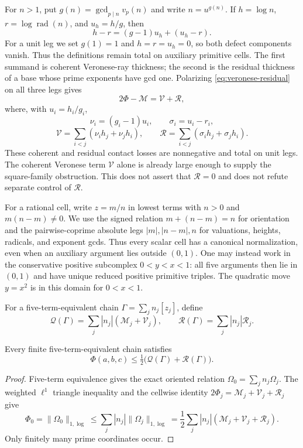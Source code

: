 For $n>1$, put $g(n)=\gcd_{p\mid n}v_p(n)$ and write $n=u^{g(n)}$.
If $h=\log n$, $r=\log\operatorname{rad}(n)$, and $u_h=h/g$, then
\begin{equation}
 h-r=(g-1)u_h+(u_h-r).
 \label{eq:veronese-residual}
\end{equation}
For a unit leg we set $g(1)=1$ and $h=r=u_h=0$, so both defect
components vanish.  Thus the definitions remain total on auxiliary
primitive cells.
The first summand is coherent Veronese-ray thickness; the second is the
residual thickness of a base whose prime exponents have gcd one.  Polarizing
\eqref{eq:veronese-residual} on all three legs gives
\[
 2\Phi-\mathcal M=\mathcal V+\mathcal R,
\]
where, with $u_i=h_i/g_i$,
\[
 \nu_i=(g_i-1)u_i,\qquad \sigma_i=u_i-r_i,
\]
\[
 \mathcal V=\sum_{i<j}(\nu_i h_j+\nu_j h_i),\qquad
 \mathcal R=\sum_{i<j}(\sigma_i h_j+\sigma_j h_i).
\]
These coherent and residual contact losses are nonnegative and total on
unit legs.  The coherent Veronese term $\mathcal V$ alone is already large
enough to supply the square-family obstruction.  This does not assert that
$\mathcal R=0$ and does not refute separate control of $\mathcal R$.

For a rational cell, write $z=m/n$ in lowest terms with $n>0$ and
$m(n-m)\ne0$.  We use the signed relation $m+(n-m)=n$ for orientation and
the pairwise-coprime absolute legs $|m|,|n-m|,n$ for valuations, heights,
radicals, and exponent gcds.  Thus every scalar cell has a canonical
normalization, even when an auxiliary argument lies outside $(0,1)$.
One may instead work in the conservative positive subcomplex
$0<y<x<1$: all five arguments then lie in $(0,1)$ and have unique reduced
positive primitive triples.  The quadratic move $y=x^2$ is in this domain
for $0<x<1$.

For a five-term-equivalent chain $\Gamma=\sum_jn_j[z_j]$, define
\[
 \mathcal Q(\Gamma)=\sum_j|n_j|(\mathcal M_j+\mathcal V_j),
 \qquad
 \mathcal R(\Gamma)=\sum_j|n_j|\mathcal R_j.
\]

\begin{proposition}
\label{prop:filling-triangle}
Every finite five-term-equivalent chain satisfies
\[
 \Phi(a,b,c)\leq\tfrac12\bigl(\mathcal Q(\Gamma)
                                      +\mathcal R(\Gamma)\bigr).
\]
\end{proposition}
\begin{proof}
Five-term equivalence gives the exact oriented relation
$\Omega_0=\sum_jn_j\Omega_j$.  The weighted $\ell^1$ triangle inequality
and the cellwise identity
$2\Phi_j=\mathcal M_j+\mathcal V_j+\mathcal R_j$ give
\[
 \Phi_0=\|\Omega_0\|_{1,\log}
 \leq\sum_j|n_j|\|\Omega_j\|_{1,\log}
 =\frac12\sum_j|n_j|(\mathcal M_j+\mathcal V_j+\mathcal R_j).
\]
Only finitely many prime coordinates occur.
\end{proof}

